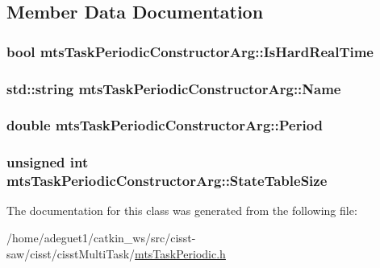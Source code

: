 \subsection{Member Data Documentation}
\hypertarget{classmts_task_periodic_constructor_arg_a584cbd7f13e57c11978c9264e78aac46}{
\subsubsection[{Is\-Hard\-Real\-Time}]{\setlength{\rightskip}{0pt plus 5cm}bool mts\-Task\-Periodic\-Constructor\-Arg\-::\-Is\-Hard\-Real\-Time}}\label{classmts_task_periodic_constructor_arg_a584cbd7f13e57c11978c9264e78aac46}
\hypertarget{classmts_task_periodic_constructor_arg_a2d6bafc9b8014ea8972324df1325fe28}{
\subsubsection[{Name}]{\setlength{\rightskip}{0pt plus 5cm}std\-::string mts\-Task\-Periodic\-Constructor\-Arg\-::\-Name}}\label{classmts_task_periodic_constructor_arg_a2d6bafc9b8014ea8972324df1325fe28}
\hypertarget{classmts_task_periodic_constructor_arg_aa83e6ea04bc9432451c8b9ba9001e629}{
\subsubsection[{Period}]{\setlength{\rightskip}{0pt plus 5cm}double mts\-Task\-Periodic\-Constructor\-Arg\-::\-Period}}\label{classmts_task_periodic_constructor_arg_aa83e6ea04bc9432451c8b9ba9001e629}
\hypertarget{classmts_task_periodic_constructor_arg_a63da643cce33a5cb0e262e4cb391c0a6}{
\subsubsection[{State\-Table\-Size}]{\setlength{\rightskip}{0pt plus 5cm}unsigned int mts\-Task\-Periodic\-Constructor\-Arg\-::\-State\-Table\-Size}}\label{classmts_task_periodic_constructor_arg_a63da643cce33a5cb0e262e4cb391c0a6}


The documentation for this class was generated from the following file\-:\begin{DoxyCompactItemize}
\item 
/home/adeguet1/catkin\-\_\-ws/src/cisst-\/saw/cisst/cisst\-Multi\-Task/\hyperlink{mts_task_periodic_8h}{mts\-Task\-Periodic.\-h}\end{DoxyCompactItemize}
